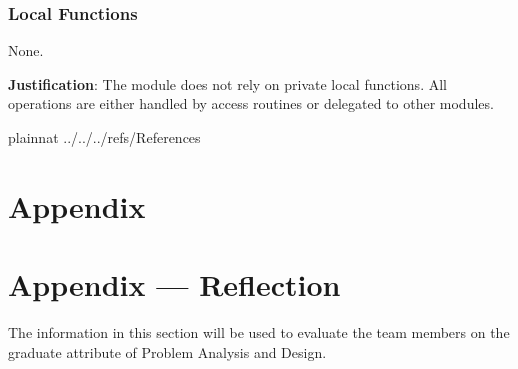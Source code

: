 \documentclass[12pt, titlepage]{article}
\begin{document}
  \subsubsection{Local Functions}
  None.

  \textbf{Justification}: The module does not rely on private local functions. All operations are either handled by access routines or delegated to other modules.


 {plainnat}
 {../../../refs/References}

\section{Appendix} \label{Appendix}


\newpage{}

\section*{Appendix --- Reflection}


The information in this section will be used to evaluate the team members on the
graduate attribute of Problem Analysis and Design.


\end{document}
